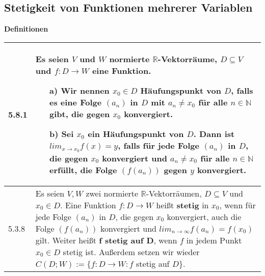 \subsection{Stetigkeit von Funktionen mehrerer Variablen}
        \noindent
    \textbf{Definitionen}
    \begin{table}[H]  
    \begin{tabularx}{\textwidth}{X m{16cm}}
        \toprule

        5.8.1 & Es seien $V$ und $W$ normierte $\mathbb{R}$-Vektorräume, $D \subseteq V$ und $f: D \rightarrow W$ eine Funktion.
                \begin{itemize}
                    \item[a)] Wir nennen $x_0 \in D$ \textbf{Häufungspunkt} von $D$, falls es eine Folge $(a_n)$ in $D$ mit 
                                $a_n \neq x_0$ für alle $n \in \mathbb{N}$ gibt, die gegen $x_0$ konvergiert.
                    \item[b)] Sei $x_0$ ein Häufungspunkt von $D$. Dann ist $lim_{x \rightarrow x_0} f(x) = y$, falls für jede 
                                Folge $(a_n)$ in $D$, die gegen $x_0$ konvergiert und $a_n \neq x_0$ für alle $n \in \mathbb{N}$
                                erfüllt, die Folge $(f(a_n))$ gegen $y$ konvergiert.
                \end{itemize} \\
        \midrule
        5.3.8 & Es seien $V,W$ zwei normierte $\mathbb{R}$-Vektorräumen, $D \subseteq V$ und $x_0 \in D$. Eine Funktion $f: D\rightarrow W$
                heißt \textbf{stetig} in $x_0$, wenn für jede Folge $(a_n)$ in $D$, die gegen $x_0$ konvergiert, auch die Folge
                $(f(a_n))$ konvergiert und $lim_{n \rightarrow \infty} f(a_n) = f(x_0)$ gilt. \hfill \break
                Weiter heißt \textbf{f stetig auf D}, wenn $f$ in jedem Punkt $x_0 \in D$ stetig ist. \hfill \break
                Au\ss erdem setzen wir wieder $C(D;W) := \{f: D\rightarrow W: f$ stetig auf $D$\}. \\

        \bottomrule

    \end{tabularx}
    \end{table}

